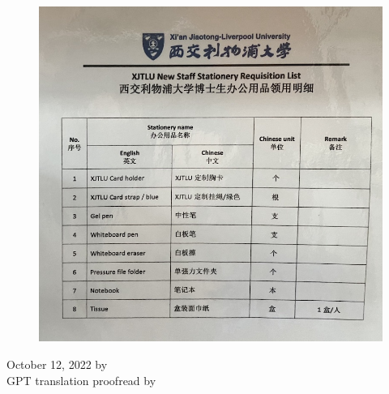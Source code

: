 \begin{figure}[H]
    \centering
    \includegraphics[width=0.6\columnwidth]{author-folder/Kai.Wu/stationery_no_sign.jpg}
\end{figure}

\begin{flushright}
    October 12, 2022 by \Wu \\
    GPT translation proofread by \Shiyao
\end{flushright}
